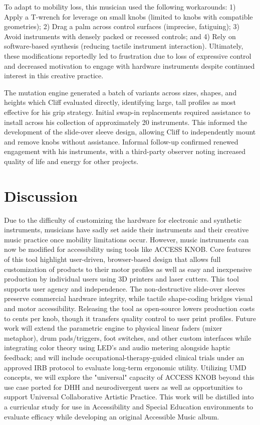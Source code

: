 \documentclass[manuscript,screen,review,anonymous]{acmart}
\begin{document}
To adapt to mobility loss, this musician used the following workarounds: 1) Apply a T-wrench for leverage on small knobs (limited to knobs with compatible geometries); 2) Drag a palm across control surfaces (imprecise, fatiguing); 3) Avoid instruments with densely packed or recessed controls; and 4) Rely on software-based synthesis (reducing tactile instrument interaction). Ultimately, these modifications reportedly led to frustration due to loss of expressive control and decreased motivation to engage with hardware instruments despite continued interest in this creative practice.

The mutation engine generated a batch of variants across sizes, shapes, and heights which Cliff evaluated directly, identifying large, tall profiles as most effective for his grip strategy. Initial swap-in replacements required assistance to install across his collection of approximately 20 instruments. This informed the development of the slide-over sleeve design, allowing Cliff to independently mount and remove knobs without assistance. Informal follow-up confirmed renewed engagement with his instruments, with a third-party observer noting increased quality of life and energy for other projects.

\section{Discussion} %

Due to the difficulty of customizing the hardware for electronic and synthetic instruments, musicians have sadly set aside their instruments and their creative music practice once mobility limitations occur. However, music instruments can now be modified for accessibility using tools like ACCESS KNOB. Core features of this tool highlight user-driven, browser-based design that allows full customization of products to their motor profiles as well as easy and inexpensive production by individual users using 3D printers and laser cutters. This tool supports user agency and independence. The non-destructive slide-over sleeves preserve commercial hardware integrity, while tactile shape-coding bridges visual and motor accessibility. Releasing the tool as open-source lowers production costs to cents per knob, though it transfers quality control to user print profiles. Future work will extend the parametric engine to physical linear faders (mixer metaphor), drum pads/triggers, foot switches, and other custom interfaces while integrating color theory using LED's and audio metering alongside haptic feedback; and will include occupational-therapy-guided clinical trials under an approved IRB protocol to evaluate long-term ergonomic utility. Utilizing UMD concepts, we will explore the "universal" capacity of ACCESS KNOB beyond this use case ported for DHH and neurodivergent users as well as opportunities to support Universal Collaborative Artistic Practice. This work will be distilled into a curricular study for use in Accessibility and Special Education environments to evaluate efficacy while developing an original Accessible Music album. 
\end{document}
